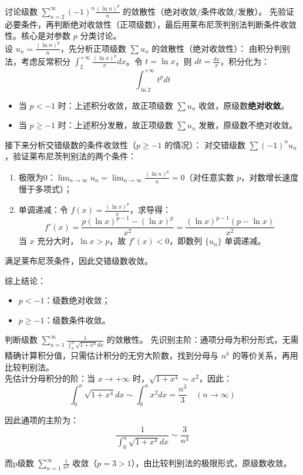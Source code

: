 \documentclass[UTF8,zihao=-4,openany]{ctexbook}
\begin{document}
\begin{example}{}{}
讨论级数 $\sum_{n=2}^\infty (-1)^n \frac{(\ln n)^p}{n}$ 的敛散性（绝对收敛/条件收敛/发散）。
\tcblower
先验证必要条件，再判断绝对收敛性（正项级数），最后用莱布尼茨判别法判断条件收敛性。核心是对参数 $p$ 分类讨论。\\
设 $u_n = \frac{(\ln n)^p}{n}$，先分析正项级数 $\sum u_n$ 的敛散性（绝对收敛性）：
由积分判别法，考虑反常积分 $\int_2^{+\infty} \frac{(\ln x)^p}{x} dx$。令 $t = \ln x$，则 $dt = \frac{dx}{x}$，积分化为：
$$
\int_{\ln 2}^{+\infty} t^p dt
$$

\begin{itemize}
    \item 当 $p < -1$ 时：上述积分收敛，故正项级数 $\sum u_n$ 收敛，原级数\textbf{绝对收敛}。
    \item 当 $p \geq -1$ 时：上述积分发散，故正项级数 $\sum u_n$ 发散，原级数不绝对收敛。
\end{itemize}

接下来分析交错级数的条件收敛性（$p \geq -1$ 的情况）：
对交错级数 $\sum (-1)^n u_n$，验证莱布尼茨判别法的两个条件：
\begin{enumerate}
    \item 极限为0：$\lim_{n\to\infty} u_n = \lim_{n\to\infty} \frac{(\ln n)^p}{n} = 0$（对任意实数 $p$，对数增长速度慢于多项式）；
    \item 单调递减：令 $f(x) = \frac{(\ln x)^p}{x}$，求导得：
    $$
    f'(x) = \frac{p (\ln x)^{p-1} - (\ln x)^p}{x^2} = \frac{(\ln x)^{p-1}(p - \ln x)}{x^2}
    $$
    当 $x$ 充分大时，$\ln x > p$，故 $f'(x) < 0$，即数列 $\{u_n\}$ 单调递减。
\end{enumerate}

满足莱布尼茨条件，因此交错级数收敛。

综上结论：
\begin{itemize}
    \item $p < -1$：级数绝对收敛；
    \item $p \geq -1$：级数条件收敛。
\end{itemize}
\end{example}

\begin{example}{}{}
判断级数 $\sum_{n=1}^\infty \frac{1}{\int_0^n \sqrt{1+x^4} dx}$ 的敛散性。
\tcblower
先识别主阶：通项分母为积分形式，无需精确计算积分值，只需估计积分的无穷大阶数，找到分母与 $n^k$ 的等价关系，再用比较判别法。\\
先估计分母积分的阶：当 $x \to +\infty$ 时，$\sqrt{1+x^4} \sim x^2$，因此：
$$
\int_0^n \sqrt{1+x^4} dx \sim \int_0^n x^2 dx = \frac{n^3}{3} \quad (n \to \infty)
$$

因此通项的主阶为：
$$
\frac{1}{\int_0^n \sqrt{1+x^4} dx} \sim \frac{3}{n^3}
$$

而p级数 $\sum_{n=1}^\infty \frac{1}{n^3}$ 收敛（$p=3>1$），由比较判别法的极限形式，原级数收敛。
\end{example}
\end{document}

